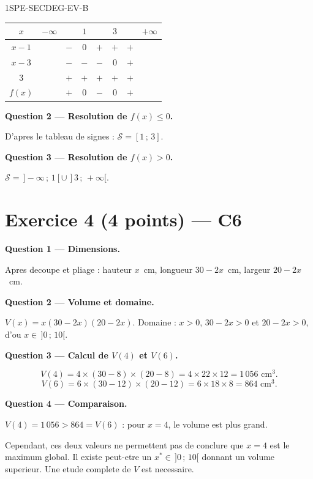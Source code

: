 \begin{corrige}{1SPE-SECDEG-EV-B}
\begin{center}
\begin{tabular}{|c|ccccccc|}
\hline
$x$ & $-\infty$ & & $1$ & & $3$ & & $+\infty$ \\
\hline
$x - 1$ & & $-$ & $0$ & $+$ & $+$ & $+$ & \\
$x - 3$ & & $-$ & $-$ & $-$ & $0$ & $+$ & \\
$3$ & & $+$ & $+$ & $+$ & $+$ & $+$ & \\
\hline
$f(x)$ & & $+$ & $0$ & $-$ & $0$ & $+$ & \\
\hline
\end{tabular}
\end{center}

\medskip
\textbf{Question 2 — Resolution de $f(x) \leq 0$.}

D'apres le tableau de signes : $\boxed{\mathcal{S} = [1\,;\,3]}$.

\medskip
\textbf{Question 3 — Resolution de $f(x) > 0$.}

$\boxed{\mathcal{S} = \,]-\infty\,;\,1[ \cup \,]3\,;\,+\infty[}$.

\section*{Exercice 4 \hfill (4 points) — C6}


\bigskip
\textbf{Question 1 — Dimensions.}


Apres decoupe et pliage : hauteur $x$~cm, longueur $30-2x$~cm, largeur $20-2x$~cm.

\medskip
\textbf{Question 2 — Volume et domaine.}

$V(x) = x(30-2x)(20-2x)$. Domaine : $x > 0$, $30-2x > 0$ et $20-2x > 0$, d'ou $x \in \,]0\,;\,10[$.

\medskip
\textbf{Question 3 — Calcul de $V(4)$ et $V(6)$.}


\[
V(4) = 4 \times (30-8) \times (20-8) = 4 \times 22 \times 12 = 1\,056 \text{ cm}^3.
\]
\[
V(6) = 6 \times (30-12) \times (20-12) = 6 \times 18 \times 8 = 864 \text{ cm}^3.
\]

\medskip
\textbf{Question 4 — Comparaison.}

$V(4) = 1\,056 > 864 = V(6)$ : pour $x = 4$, le volume est plus grand.

Cependant, ces deux valeurs ne permettent pas de conclure que $x = 4$ est le maximum global. Il existe peut-etre un $x^* \in \,]0\,;\,10[$ donnant un volume superieur. Une etude complete de $V$ est necessaire.

\end{corrige}
